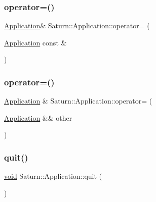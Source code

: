 \mbox{\label{class_saturn_1_1_application_af2bf9969a59d0184c05d2463a1a58ecd}} 
\subsubsection{\texorpdfstring{operator=()}{operator=()}\hspace{0.1cm}{\footnotesize\ttfamily [1/2]}}
{\footnotesize\ttfamily \mbox{\hyperlink{class_saturn_1_1_application}{Application}}\& Saturn\+::\+Application\+::operator= (\begin{DoxyParamCaption}\item[{\mbox{\hyperlink{class_saturn_1_1_application}{Application}} const \&}]{ }\end{DoxyParamCaption})\hspace{0.3cm}{\ttfamily [delete]}}

\mbox{\label{class_saturn_1_1_application_a1b57eca790c1ed09f09375a66eb14fa4}} 
\subsubsection{\texorpdfstring{operator=()}{operator=()}\hspace{0.1cm}{\footnotesize\ttfamily [2/2]}}
{\footnotesize\ttfamily \mbox{\hyperlink{class_saturn_1_1_application}{Application}} \& Saturn\+::\+Application\+::operator= (\begin{DoxyParamCaption}\item[{\mbox{\hyperlink{class_saturn_1_1_application}{Application}} \&\&}]{other }\end{DoxyParamCaption})}

\mbox{\label{class_saturn_1_1_application_afb4a680c55f5e8b13412cdd87a6d0b37}} 
\subsubsection{\texorpdfstring{quit()}{quit()}}
{\footnotesize\ttfamily \mbox{\hyperlink{glad_8h_a950fc91edb4504f62f1c577bf4727c29}{void}} Saturn\+::\+Application\+::quit (\begin{DoxyParamCaption}{ }\end{DoxyParamCaption})}

